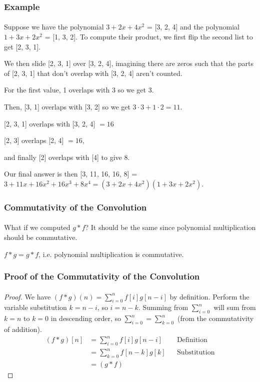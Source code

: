 \documentclass[11pt,handout]{beamer}             %
\begin{document}
\begin{frame}
\frametitle{Example}
\framesubtitle{}
Suppose we have the polynomial \( 3 + 2x + 4x^2 \) = [3, 2, 4]
and the polynomial \( 1 + 3x + 2x^2 \) = [1, 3, 2]. To compute their
product, we first flip the second list to get [2, 3, 1]. \pause

We then slide [2, 3, 1] over [3, 2, 4],
imagining there are zeros such that the parts of [2, 3, 1]
that don't overlap with [3, 2, 4] aren't counted. \pause

For the first value, 1 overlaps with 3 so we get 3. \pause

Then, [3, 1] overlaps with [3, 2] so we get \( 3 \cdot 3 + 1 \cdot 2 = 11 \).
\pause

[2, 3, 1] overlaps with [3, 2, 4] \( = 16 \) \pause

[2, 3] overlaps [2, 4] \( = 16 \), \pause

and finally [2] overlaps with [4] to give 8. \pause

Our final answer is then [3, 11, 16, 16, 8] = \( 3 + 11x + 16x^2 + 16x^3 + 8x^4
= (3 + 2x + 4x^2)(1 + 3x + 2x^2) \).
\end{frame}

\begin{frame}
\frametitle{Commutativity of the Convolution}
\framesubtitle{}
What if we computed \( g * f \)? It should be the same since
polynomial multiplication should be commutative.
\begin{theorem}
    \( f * g = g * f \), i.e. polynomial multiplication is commutative.
\end{theorem}
\end{frame}

\begin{frame}
\frametitle{Proof of the Commutativity of the Convolution}
\framesubtitle{}
\begin{proof}
    We have \( (f * g)(n) = \sum^n_{i = 0} f[i]g[n - i] \) by definition.
Perform the variable substitution \( k = n - i \), so \( i = n - k \).
Summing from \( \sum^n_{i = 0} \) will sum from \( k = n \) to \( k = 0 \)
in descending order, so \( \sum^n_{i = 0} = \sum^n_{k = 0} \)
(from the commutativity of addition).
\begin{align*}
    (f * g)[n] &= \sum^n_{i = 0} f[i]g[n - i] && \text{Definition} \\
               &= \sum^n_{k = 0} f[n - k]g[k] && \text{Substitution} \\
               &= (g * f)
\end{align*}
\end{proof}
\end{frame}
\end{document}
